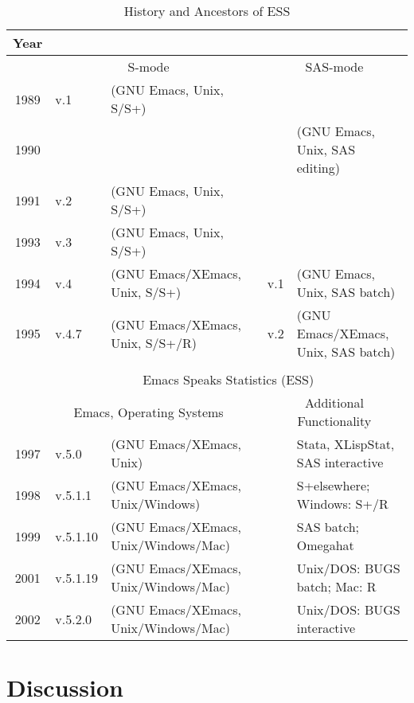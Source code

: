 \documentclass{article}
\begin{document}
\begin{table}[tbp]
  \centering
  {\scriptsize
  \begin{tabular}{c ll c ll}
\hline
    Year  \\
\hline
         & \multicolumn{2}{c}{S-mode}               && \multicolumn{2}{c}{SAS-mode} \\
\cline{2-3} \cline{5-6}
    1989 & v.1   & (GNU Emacs, Unix, S/S+)          &&  \\
    1990 &       &                                  &&     & (GNU Emacs, Unix, SAS editing) \\
    1991 & v.2   & (GNU Emacs, Unix, S/S+)          && \\
    1993 & v.3   & (GNU Emacs, Unix, S/S+)          && \\
    1994 & v.4   & (GNU Emacs/XEmacs, Unix, S/S+)   && v.1 & (GNU Emacs, Unix, SAS batch) \\
    1995 & v.4.7 & (GNU Emacs/XEmacs, Unix, S/S+/R) && v.2 & (GNU Emacs/XEmacs, Unix, SAS batch) \\
         &       &                                  &&     & \\ \cline{2-6}
         & \multicolumn{5}{c}{Emacs Speaks Statistics (ESS)} \\
    \cline{2-6}
         &\multicolumn{2}{c}{Emacs, Operating Systems}     &&\multicolumn{2}{c}{Additional Functionality}\\
\cline{2-3} \cline{5-6}
    1997 & v.5.0    & (GNU Emacs/XEmacs, Unix)             &&& Stata, XLispStat, SAS interactive \\
    1998 & v.5.1.1  & (GNU Emacs/XEmacs, Unix/Windows)     &&& S+elsewhere; Windows: S+/R\\
    1999 & v.5.1.10 & (GNU Emacs/XEmacs, Unix/Windows/Mac) &&& SAS batch; Omegahat \\
    2001 & v.5.1.19 & (GNU Emacs/XEmacs, Unix/Windows/Mac) &&& Unix/DOS: BUGS batch; Mac: R \\
    2002 & v.5.2.0  & (GNU Emacs/XEmacs, Unix/Windows/Mac) &&& Unix/DOS: BUGS interactive \\
    \hline
  \end{tabular}
  }
  \caption{History and Ancestors of ESS}
  \label{tab:timeline}
\end{table}

\section{Discussion}
\label{sec:concl}
\end{document}
